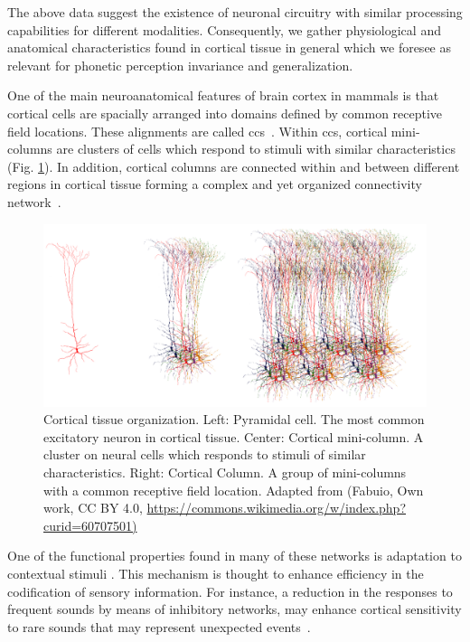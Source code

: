 {The above data suggest the existence of neuronal circuitry with similar processing capabilities for different modalities. Consequently, we gather physiological and anatomical characteristics found in cortical tissue in general which we foresee as relevant for phonetic perception invariance and generalization.

One of the main neuroanatomical features of brain cortex in mammals is that cortical cells are spacially arranged into domains defined by common receptive field locations. These alignments are called \glspl{cc}~\cite{mountcastle_1955, mountcastle_1957, hubel_1962, hubel_1968}. Within \glspl{cc}, cortical mini-columns are clusters of cells which respond to stimuli with similar characteristics (Fig. \ref{fig:Biological}). In addition, cortical columns are connected within and between different regions in cortical tissue forming a complex and yet organized connectivity network~\cite{mountcastle_1997}. 

\begin{figure}[h!]
    \centering
    \includegraphics[width=1.0\textwidth]{Biological.png}
    \caption{Cortical tissue organization. Left: Pyramidal cell. The most common excitatory neuron in cortical tissue.
    Center: Cortical mini-column. A cluster on neural cells which responds to stimuli of similar characteristics.
    Right: Cortical Column. A group of mini-columns with a common receptive field location.
    Adapted from (Fabuio, Own work, CC BY 4.0, \url{https://commons.wikimedia.org/w/index.php?curid=60707501)}}
    \label{fig:Biological}
\end{figure}

One of the functional properties found in many of these networks is adaptation to contextual stimuli \cite{KRAUSE201436,doi:10.1167/16.13.1}. This mechanism is thought to enhance efficiency in the codification of sensory information. For instance, a reduction in the responses to frequent sounds by means of inhibitory networks, may enhance cortical sensitivity to rare sounds that may represent unexpected events~\cite{Natan2015ComplementaryCO,nachum_2003,Javitt11962}.

}
